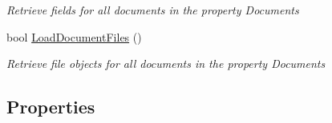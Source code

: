 \begin{DoxyCompactItemize}
\begin{DoxyCompactList}\small\item\em Retrieve fields for all documents in the property \textquotesingle{}Documents\textquotesingle{} \end{DoxyCompactList}\item 
bool \mbox{\hyperlink{class_database_object_acdf5c9ee898d4473350a2f4878af5a23}{Load\+Document\+Files}} ()
\begin{DoxyCompactList}\small\item\em Retrieve file objects for all documents in the property \textquotesingle{}Documents\textquotesingle{} \end{DoxyCompactList}\end{DoxyCompactItemize}
\subsection*{Properties}
